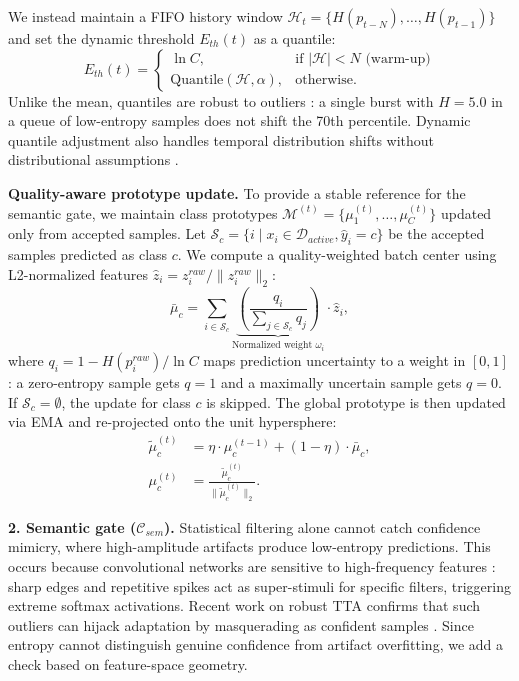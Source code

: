 \documentclass[sigconf, screen, review, anonymous]{acmart}
\theoremstyle{plain}
\theoremstyle{definition}
\theoremstyle{remark}
\begin{document}
We instead maintain a FIFO history window $\mathcal{H}_t = \{H(p_{t-N}), \dots, H(p_{t-1})\}$ and set the dynamic threshold $E_{th}(t)$ as a quantile:
\begin{equation}
	E_{th}(t) = \begin{cases}
		\ln C, & \text{if } |\mathcal{H}| < N \text{ (warm-up)} \\
		\text{Quantile}(\mathcal{H}, \alpha), & \text{otherwise}.
	\end{cases}
\end{equation}
Unlike the mean, quantiles are robust to outliers \citep{huber1981robust}: a single burst with $H=5.0$ in a queue of low-entropy samples does not shift the 70th percentile. Dynamic quantile adjustment also handles temporal distribution shifts without distributional assumptions \citep{gibbs2021adaptive}.


	\textbf{Quality-aware prototype update.}
	To provide a stable reference for the semantic gate, we maintain class prototypes $\mathcal{M}^{(t)} = \{\mu_1^{(t)}, \dots, \mu_C^{(t)}\}$ updated only from accepted samples. Let $\mathcal{S}_c = \{i \mid x_i \in \mathcal{D}_{active}, \hat{y}_i = c\}$ be the accepted samples predicted as class $c$. We compute a quality-weighted batch center using L2-normalized features $\hat{z}_i = z^{raw}_i / \|z^{raw}_i\|_2$:
	\begin{equation}
		\bar{\mu}_c = \sum_{i \in \mathcal{S}_c} \underbrace{\left( \frac{q_i}{\sum_{j \in \mathcal{S}_c} q_j} \right)}_{\text{Normalized weight } \omega_i} \cdot \hat{z}_i,
	\end{equation}
	where $q_i = 1 - H(p^{raw}_i)/\ln C$ maps prediction uncertainty to a weight in $[0,1]$: a zero-entropy sample gets $q=1$ and a maximally uncertain sample gets $q=0$. If $\mathcal{S}_c = \emptyset$, the update for class $c$ is skipped. The global prototype is then updated via EMA and re-projected onto the unit hypersphere:
	\begin{equation}
		\begin{aligned}
		\tilde{\mu}_c^{(t)} &= \eta \cdot \mu_c^{(t-1)} + (1 - \eta) \cdot \bar{\mu}_c, \\
		\mu_c^{(t)} &= \frac{\tilde{\mu}_c^{(t)}}{\|\tilde{\mu}_c^{(t)}\|_2}.
		\end{aligned}
		\label{eq:proto_ema}
	\end{equation}

	\textbf{2. Semantic gate ($\mathcal{C}_{sem}$).}
	Statistical filtering alone cannot catch confidence mimicry, where high-amplitude artifacts produce low-entropy predictions. This occurs because convolutional networks are sensitive to high-frequency features \citep{wang2020high}: sharp edges and repetitive spikes act as super-stimuli for specific filters, triggering extreme softmax activations. Recent work on robust TTA confirms that such outliers can hijack adaptation by masquerading as confident samples \citep{park2024medbn}. Since entropy cannot distinguish genuine confidence from artifact overfitting, we add a check based on feature-space geometry.
\end{document}
